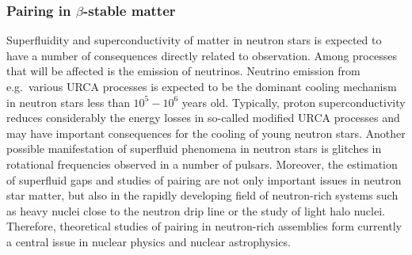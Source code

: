 \subsubsection{Pairing in $\beta$-stable matter}

Superfluidity and superconductivity of matter in neutron stars is 
expected to have a number of consequences directly related 
to observation.
Among processes that will be affected is the
emission of neutrinos. Neutrino emission from e.g.\ 
various URCA processes  is expected to be the dominant 
cooling mechanism in neutron stars less than $10^5-10^6$ years old.
Typically,
proton superconductivity  reduces considerably the energy losses
in so-called modified URCA processes 
and may have important consequences for the
cooling of young neutron stars.
Another  possible manifestation of superfluid 
phenomena in neutron stars  
is glitches in rotational frequencies  observed in a number
of pulsars. Moreover, 
the estimation of superfluid gaps and studies of pairing 
are not only important issues
in neutron star matter, but also in the rapidly developing 
field of neutron-rich systems such as heavy nuclei
close to the neutron drip line or the study of 
light halo nuclei. 
Therefore, theoretical studies
of pairing in neutron-rich assemblies form currently a central
issue in nuclear physics and nuclear astrophysics. 

